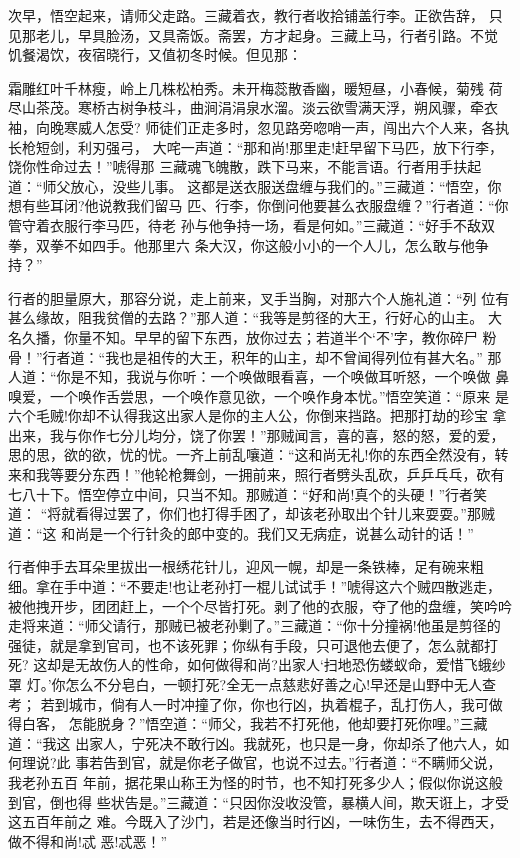 次早，悟空起来，请师父走路。三藏着衣，教行者收拾铺盖行李。正欲告辞，
只见那老儿，早具脸汤，又具斋饭。斋罢，方才起身。三藏上马，行者引路。不觉
饥餐渴饮，夜宿晓行，又值初冬时候。但见那：

霜雕红叶千林瘦，岭上几株松柏秀。未开梅蕊散香幽，暖短昼，小春候，菊残
荷尽山茶茂。寒桥古树争枝斗，曲涧涓涓泉水溜。淡云欲雪满天浮，朔风骤，牵衣
袖，向晚寒威人怎受?
师徒们正走多时，忽见路旁唿哨一声，闯出六个人来，各执长枪短剑，利刃强弓，
大咤一声道：“那和尚!那里走!赶早留下马匹，放下行李，饶你性命过去！”唬得那
三藏魂飞魄散，跌下马来，不能言语。行者用手扶起道：“师父放心，没些儿事。
这都是送衣服送盘缠与我们的。”三藏道：“悟空，你想有些耳闭?他说教我们留马
匹、行李，你倒问他要甚么衣服盘缠？”行者道：“你管守着衣服行李马匹，待老
孙与他争持一场，看是何如。”三藏道：“好手不敌双拳，双拳不如四手。他那里六
条大汉，你这般小小的一个人儿，怎么敢与他争持？”

行者的胆量原大，那容分说，走上前来，叉手当胸，对那六个人施礼道：“列
位有甚么缘故，阻我贫僧的去路？”那人道：“我等是剪径的大王，行好心的山主。
大名久播，你量不知。早早的留下东西，放你过去；若道半个‘不’字，教你碎尸
粉骨！”行者道：“我也是祖传的大王，积年的山主，却不曾闻得列位有甚大名。”
那人道：“你是不知，我说与你听：一个唤做眼看喜，一个唤做耳听怒，一个唤做
鼻嗅爱，一个唤作舌尝思，一个唤作意见欲，一个唤作身本忧。”悟空笑道：“原来
是六个毛贼!你却不认得我这出家人是你的主人公，你倒来挡路。把那打劫的珍宝
拿出来，我与你作七分儿均分，饶了你罢！”那贼闻言，喜的喜，怒的怒，爱的爱，
思的思，欲的欲，忧的忧。一齐上前乱嚷道：“这和尚无礼!你的东西全然没有，转
来和我等要分东西！”他轮枪舞剑，一拥前来，照行者劈头乱砍，乒乒乓乓，砍有
七八十下。悟空停立中间，只当不知。那贼道：“好和尚!真个的头硬！”行者笑道：
“将就看得过罢了，你们也打得手困了，却该老孙取出个针儿来耍耍。”那贼道：“这
和尚是一个行针灸的郎中变的。我们又无病症，说甚么动针的话！”

行者伸手去耳朵里拔出一根绣花针儿，迎风一幌，却是一条铁棒，足有碗来粗
细。拿在手中道：“不要走!也让老孙打一棍儿试试手！”唬得这六个贼四散逃走，
被他拽开步，团团赶上，一个个尽皆打死。剥了他的衣服，夺了他的盘缠，笑吟吟
走将来道：“师父请行，那贼已被老孙剿了。”三藏道：“你十分撞祸!他虽是剪径的
强徒，就是拿到官司，也不该死罪；你纵有手段，只可退他去便了，怎么就都打死?
这却是无故伤人的性命，如何做得和尚?出家人‘扫地恐伤蝼蚁命，爱惜飞蛾纱罩
灯。’你怎么不分皂白，一顿打死?全无一点慈悲好善之心!早还是山野中无人查考；
若到城市，倘有人一时冲撞了你，你也行凶，执着棍子，乱打伤人，我可做得白客，
怎能脱身？”悟空道：“师父，我若不打死他，他却要打死你哩。”三藏道：“我这
出家人，宁死决不敢行凶。我就死，也只是一身，你却杀了他六人，如何理说?此
事若告到官，就是你老子做官，也说不过去。”行者道：“不瞒师父说，我老孙五百
年前，据花果山称王为怪的时节，也不知打死多少人；假似你说这般到官，倒也得
些状告是。”三藏道：“只因你没收没管，暴横人间，欺天诳上，才受这五百年前之
难。今既入了沙门，若是还像当时行凶，一味伤生，去不得西天，做不得和尚!忒
恶!忒恶！”

